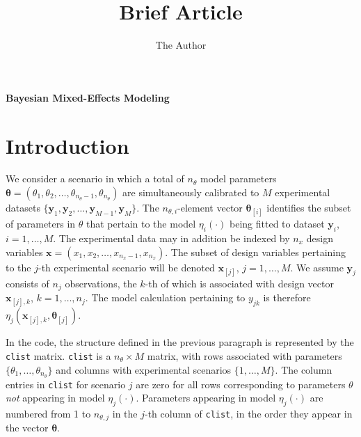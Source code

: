 \documentclass[11pt, oneside]{article}   	%
\title{Brief Article}
\author{The Author}
\begin{document}

\begin{center}
{\bf {\LARGE Bayesian Mixed-Effects Modeling}}
\end{center}

\section{Introduction}

\noindent
We consider a scenario in which a total of $n_\theta$ model parameters $\mathbf{\theta} = \left(\theta_1, \theta_2, \ldots, \theta_{n_\theta-1}, \theta_{n_\theta} \right)$ are simultaneously calibrated to $M$ experimental datasets $\{ \mathbf{y}_1, \mathbf{y}_2, \ldots, \mathbf{y}_{M-1}, \mathbf{y}_M \}$.  The $n_{\theta,i}$-element vector $\mathbf{\theta}_{[i]}$ identifies the subset of parameters in $\theta$ that pertain to the model $\eta_i (\cdot)$ being fitted to dataset $\mathbf{y}_i$, $i = 1, \ldots, M$.  The experimental data may in addition be indexed by $n_x$ design variables $\mathbf{x} = \left( x_1, x_2, \ldots, x_{n_x-1}, x_{n_x} \right)$.  The subset of design variables pertaining to the $j$-th experimental scenario will be denoted $\mathbf{x}_{[j]}$, $j = 1, \ldots, M$.  We assume $\mathbf{y}_j$ consists of $n_j$ observations, the $k$-th of which is associated with design vector $\mathbf{x}_{[j],k}$, $k = 1, \ldots, n_j$.  The model calculation pertaining to $y_{jk}$ is therefore $\eta_j \left(\mathbf{x}_{[j],k}, \mathbf{\theta}_{[j]} \right)$.

\vspace{5mm}

\noindent
In the code, the structure defined in the previous paragraph is represented by the {\tt clist} matrix.  {\tt clist} is a $n_\theta \times M$ matrix, with rows associated with parameters $\{ \theta_1, \ldots, \theta_{n_\theta} \}$ and columns with experimental scenarios $\{ 1, \ldots, M \}$.  The column entries in {\tt clist} for scenario $j$ are zero for all rows corresponding to parameters $\theta$ \emph{not} appearing in model $\eta_j (\cdot)$.  Parameters appearing in model $\eta_j (\cdot)$ are numbered from 1 to $n_{\theta,j}$ in the $j$-th column of {\tt clist}, in the order they appear in the vector $\mathbf{\theta}$.  
\end{document}
